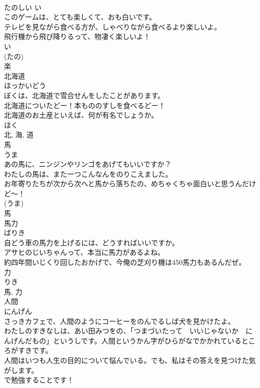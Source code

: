 \documentclass[8pt]{extreport}
\begin{document}
\begin{CJK}{UTF8}{min}
\\	たのしい	い 
\\	このゲームは、とても楽しくて、おも白いです。	
\\	テレビを見ながら食べる方が、しゃべりながら食べるより楽しいよ。	
\\	飛行機から飛び降りるって、物凄く楽しいよ！	
\\	い 
\\	(たの) 
\\	楽	
\\	北海道	
\\	ほっかいどう	
\\	ぼくは、北海道で雪合せんをしたことがあります。	
\\	北海道についたどー！本もののすしを食べるどー！	
\\	北海道のお土産といえば、何が有名でしょうか。	
\\	ほく 
\\	北, 海, 道	
\\	馬	
\\	うま	
\\	あの馬に、ニンジンやリンゴをあげてもいいですか？	
\\	わたしの馬は、また一つこんなんをのりこえました。	
\\	お年寄りたちが次から次へと馬から落ちたの、めちゃくちゃ面白いと思うんだけど〜！	
\\	(うま) 
\\	馬	
\\	馬力	
\\	ばりき	
\\	自どう車の馬力を上げるには、どうすればいいですか。	
\\	アサヒのじいちゃんって、本当に馬力があるよね。	
\\	約四年間いじくり回したおかげで、今俺の芝刈り機は450馬力もあるんだぜ。	
\\	力 
\\	りき 
\\	馬, 力	
\\	人間	
\\	にんげん	
\\	さっきカフェで、人間のようにコーヒーをのんでるしば犬を見かけたよ。	
\\	わたしのすきなしは、あい田みつをの、「つまづいたって　いいじゃないか　にんげんだもの」というしです。人間というかん字がひらがなでかかれているところがすきです。	
\\	人間はいつも人生の目的について悩んでいる。でも、私はその答えを見つけた気がします。
\\	で勉強することです！	

\end{CJK}
\end{document}
